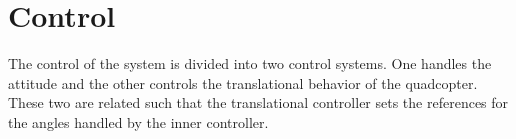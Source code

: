 \section{Control}
The control of the system is divided into two control systems. One handles the attitude and the other controls the translational behavior of the quadcopter. These two are related such that the translational controller sets the references for the angles handled by the inner controller.
